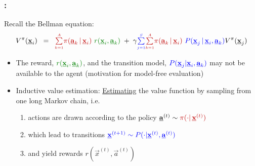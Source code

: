 \begin{frame}\frametitle{\subsecname:~\subsubsecname}

	Recall the Bellman equation:
	\begin{equation}
			V^\pi(\vec x_i) \;\;=\;\;
				{\color{policy} \smallsum{k=1}A 
					\pi(\vec a_k \,|\, \vec x_i)}~ 
					{\color{reward} r(\vec x_i, \vec a_k)}
				\;+\; \gamma {\color{trans} \smallsum{j=1}{S}}
					{\color{policy} \smallsum{k=1}A 
					\pi(\vec a_k \,|\, \vec x_i)}~
					{\color{trans} P(\vec x_j \,|\, \vec x_i, \vec a_k)} V^\pi(\vec x_j)
	\end{equation}

	\pause 
		
	\begin{itemize}
		\item The reward, ${\color{reward} r(\vec x_i, \vec a_k)}$, and the transition model, ${\color{trans}P(\vec  x_j | \vec  x_i, \vec  a_k)}$
		 may not be available to the agent (motivation for model-free evaluation)
		 
		 \pause
		 
		 \slidesonly{\vspace{5mm}}
		 
		\item Inductive value estimation: \underline{Estimating} the value function by sampling from one long Markov chain, i.e.
			\begin{enumerate}
				\item actions are drawn according to the {\color{policy}policy} 
				$ \vec a^{(t)} \sim {\color{policy}\pi(\cdot|\, \vec x^{(t)})}$
				
				\item which lead to {\color{trans}transitions} 
					${\color{trans}\vec x^{(t+1)}
					\sim P(\cdot|\vec x^{(t)},\vec a^{(t)})}$
					
				\item and yield {\color{reward} rewards 
					$r(\vec x^{(t)},\vec a^{(t)})$}
			\end{enumerate}
	\end{itemize}
	
\end{frame}


